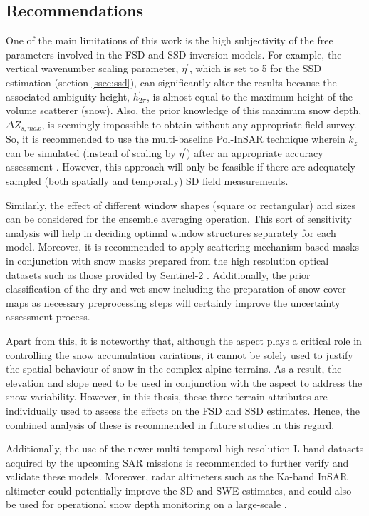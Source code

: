 \documentclass[review]{elsarticle}
\numberwithin{equation}{section}
\numberwithin{figure}{section}
\numberwithin{table}{section}
\begin{document}
\subsection{Recommendations}

One of the main limitations of this work is the high subjectivity of the free parameters involved in the FSD and SSD inversion models. For example, the vertical wavenumber scaling parameter, $\eta^\prime$, which is set to 5 for the SSD estimation (section \ref{ssec:ssd}), can significantly alter the results because the associated ambiguity height, $h_{2\pi}^\prime$, is almost equal to the maximum height of the volume scatterer (snow). Also, the prior knowledge of this maximum snow depth, $\Delta{Z_{s, max}}$, is seemingly impossible to obtain without any appropriate field survey. So, it is recommended to use the multi-baseline Pol-InSAR technique \citep{Cloude2010} wherein $k_z$ can be simulated (instead of scaling by $\eta^\prime$) after an appropriate accuracy assessment \citep{Kumar2017}. However, this approach will only be feasible if there are adequately sampled (both spatially and temporally) SD field measurements.

Similarly, the effect of different window shapes (square or rectangular) and sizes can be considered for the ensemble averaging operation. This sort of sensitivity analysis will help in deciding optimal window structures separately for each model. Moreover, it is recommended to apply scattering mechanism based masks in conjunction with snow masks prepared from the high resolution optical datasets such as those provided by Sentinel-2 \citep{Zhu2015}. Additionally, the prior classification of the dry and wet snow including the preparation of snow cover maps \citep{Leinss2018, Thakur2012, Zhu2015} as necessary preprocessing steps will certainly improve the uncertainty assessment process.

Apart from this, it is noteworthy that, although the aspect plays a critical role in controlling the snow accumulation variations, it cannot be solely used to justify the spatial behaviour of snow in the complex alpine terrains. As a result, the elevation and slope need to be used in conjunction with the aspect to address the snow variability. However, in this thesis, these three terrain attributes are individually used to assess the effects on the FSD and SSD estimates. Hence, the combined analysis of these is recommended in future studies in this regard.

Additionally, the use of the newer multi-temporal high resolution L-band datasets acquired by the upcoming SAR missions \citep{Krieger2016, Rosen2017} is recommended to further verify and validate these models. Moreover, radar altimeters such as the Ka-band InSAR altimeter could potentially improve the SD and SWE estimates, and could also be used for operational snow depth monitoring on a large-scale \citep{Hensley2016, Kim2018, Moller2011, Speziali2018}.
\end{document}
